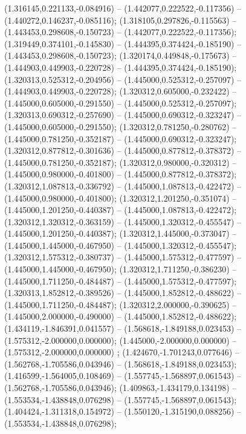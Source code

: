  (1.316145,0.221133,-0.084916) -- (1.442077,0.222522,-0.117356) -- (1.440272,0.146237,-0.085116);
 (1.318105,0.297826,-0.115563) -- (1.443453,0.298608,-0.150723) -- (1.442077,0.222522,-0.117356);
 (1.319449,0.374101,-0.145830) -- (1.444395,0.374424,-0.185190) -- (1.443453,0.298608,-0.150723);
 (1.320174,0.449848,-0.175673) -- (1.444903,0.449903,-0.220728) -- (1.444395,0.374424,-0.185190);
 (1.320313,0.525312,-0.204956) -- (1.445000,0.525312,-0.257097) -- (1.444903,0.449903,-0.220728);
 (1.320312,0.605000,-0.232422) -- (1.445000,0.605000,-0.291550) -- (1.445000,0.525312,-0.257097);
 (1.320313,0.690312,-0.257690) -- (1.445000,0.690312,-0.323247) -- (1.445000,0.605000,-0.291550);
 (1.320312,0.781250,-0.280762) -- (1.445000,0.781250,-0.352187) -- (1.445000,0.690312,-0.323247);
 (1.320312,0.877812,-0.301636) -- (1.445000,0.877812,-0.378372) -- (1.445000,0.781250,-0.352187);
 (1.320312,0.980000,-0.320312) -- (1.445000,0.980000,-0.401800) -- (1.445000,0.877812,-0.378372);
 (1.320312,1.087813,-0.336792) -- (1.445000,1.087813,-0.422472) -- (1.445000,0.980000,-0.401800);
 (1.320312,1.201250,-0.351074) -- (1.445000,1.201250,-0.440387) -- (1.445000,1.087813,-0.422472);
 (1.320312,1.320312,-0.363159) -- (1.445000,1.320312,-0.455547) -- (1.445000,1.201250,-0.440387);
 (1.320312,1.445000,-0.373047) -- (1.445000,1.445000,-0.467950) -- (1.445000,1.320312,-0.455547);
 (1.320312,1.575312,-0.380737) -- (1.445000,1.575312,-0.477597) -- (1.445000,1.445000,-0.467950);
 (1.320312,1.711250,-0.386230) -- (1.445000,1.711250,-0.484487) -- (1.445000,1.575312,-0.477597);
 (1.320313,1.852812,-0.389526) -- (1.445000,1.852812,-0.488622) -- (1.445000,1.711250,-0.484487);
 (1.320312,2.000000,-0.390625) -- (1.445000,2.000000,-0.490000) -- (1.445000,1.852812,-0.488622);
 (1.434119,-1.846391,0.041557) -- (1.568618,-1.849188,0.023453) -- (1.575312,-2.000000,0.000000);
 (1.445000,-2.000000,0.000000) -- (1.575312,-2.000000,0.000000) ;
 (1.424670,-1.701243,0.077646) -- (1.562768,-1.705586,0.043946) -- (1.568618,-1.849188,0.023453);
 (1.416599,-1.564005,0.108469) -- (1.557745,-1.568897,0.061543) -- (1.562768,-1.705586,0.043946);
 (1.409863,-1.434179,0.134198) -- (1.553534,-1.438848,0.076298) -- (1.557745,-1.568897,0.061543);
 (1.404424,-1.311318,0.154972) -- (1.550120,-1.315190,0.088256) -- (1.553534,-1.438848,0.076298);

